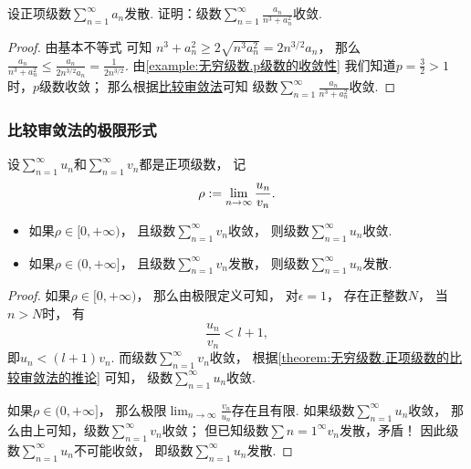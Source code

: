 \begin{example}
设正项级数\(\sum_{n=1}^\infty a_n\)发散.
证明：级数\(\sum_{n=1}^\infty \frac{a_n}{n^3+a_n^2}\)收敛.
\begin{proof}
由基本不等式  可知
\(n^3+a_n^2\geq2\sqrt{n^3 a_n^2}=2n^{3/2}a_n\)，
那么\(\frac{a_n}{n^3+a_n^2}\leq\frac{a_n}{2n^{3/2}a_n}=\frac{1}{2n^{3/2}}\).
由\cref{example:无穷级数.p级数的收敛性}
我们知道\(p=\frac{3}{2}>1\)时，\(p\)级数收敛；
那么根据\hyperref[theorem:无穷级数.正项级数的比较审敛法]{比较审敛法}可知
级数\(\sum_{n=1}^\infty \frac{a_n}{n^3+a_n^2}\)收敛.
\end{proof}
\end{example}

\subsubsection{比较审敛法的极限形式}
\begin{theorem}[比较审敛法的极限形式]\label{theorem:无穷级数.正项级数的比较审敛法的极限形式}
设\(\sum_{n=1}^\infty u_n\)和\(\sum_{n=1}^\infty v_n\)都是正项级数，
记\[
	\rho
	:=
	\lim_{n\to\infty} \frac{u_n}{v_n}.
\]
\begin{itemize}
	\item 如果\(\rho\in[0,+\infty)\)，
	且级数\(\sum_{n=1}^\infty v_n\)收敛，
	则级数\(\sum_{n=1}^\infty u_n\)收敛.

	\item 如果\(\rho\in(0,+\infty]\)，
	且级数\(\sum_{n=1}^\infty v_n\)发散，
	则级数\(\sum_{n=1}^\infty u_n\)发散.
\end{itemize}
\begin{proof}
如果\(\rho\in[0,+\infty)\)，
那么由极限定义可知，
对\(\epsilon=1\)，
存在正整数\(N\)，
当\(n>N\)时，
有\[
	\frac{u_n}{v_n} < l+1,
\]
即\(u_n < (l+1) v_n\).
而级数\(\sum_{n=1}^\infty v_n\)收敛，
根据\cref{theorem:无穷级数.正项级数的比较审敛法的推论} 可知，
级数\(\sum_{n=1}^\infty u_n\)收敛.

如果\(\rho\in(0,+\infty]\)，
那么极限\(\lim_{n\to\infty} \frac{v_n}{u_n}\)存在且有限.
如果级数\(\sum_{n=1}^\infty u_n\)收敛，
那么由上可知，级数\(\sum_{n=1}^\infty v_n\)收敛；
但已知级数\(\sum\limits{n=1}^\infty v_n\)发散，矛盾！
因此级数\(\sum_{n=1}^\infty u_n\)不可能收敛，
即级数\(\sum_{n=1}^\infty u_n\)发散.
\end{proof}
\end{theorem}

